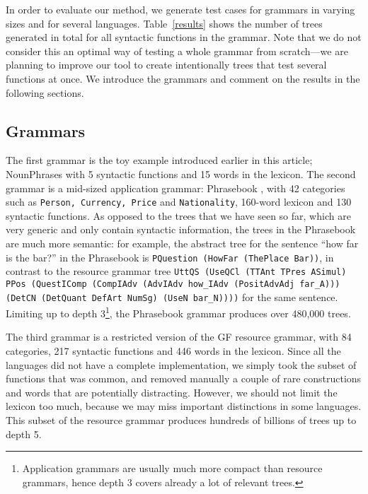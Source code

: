 \documentclass[11pt]{article}
\def\t#1{\texttt{#1}}
\begin{document}
In order to evaluate our method, we generate test cases for grammars
in varying sizes and for several languages. Table~\ref{results} shows
the number of trees generated in total for all syntactic functions in
the grammar. Note that we do not consider this an optimal way of
testing a whole grammar from scratch---we are planning to improve our
tool to create intentionally trees that test several functions at
once. 
We introduce the grammars and comment on the results in the following sections.

\subsection{Grammars}

The first grammar is the toy example introduced earlier in this
article; NounPhrases with 5 syntactic functions and 15 words in the
lexicon.
The second grammar is a mid-sized application grammar: Phrasebook
\cite{ranta2010phrasebook}, with 42 categories such as \t{Person,
  Currency, Price} and \t{Nationality}, 160-word lexicon and 130
syntactic functions. As opposed to the trees that we have seen so far,
which are very generic and only contain syntactic information, the
trees in the Phrasebook are much more semantic: for example, the
abstract tree for the sentence ``how far is the bar?'' in the
Phrasebook is \t{PQuestion (HowFar (ThePlace Bar))}, in contrast to the
resource grammar tree {\tt \small UttQS (UseQCl (TTAnt TPres ASimul)
  PPos (QuestIComp (CompIAdv (AdvIAdv how\_IAdv (PositAdvAdj far\_A)))
  (DetCN (DetQuant DefArt NumSg) (UseN bar\_N))))} for the same
sentence. Limiting up to depth 3\footnote{Application grammars are usually
much more compact than resource grammars, hence depth 3 covers already
a lot of relevant trees.}, the Phrasebook grammar produces over
480,000 trees.


The third grammar is a restricted version of the GF resource grammar,
with 84 categories, 217 syntactic functions and 446 words in the
lexicon. Since all the languages did not have a complete
implementation, we simply took the subset of functions that was
common, and removed manually a couple of rare constructions and words
that are potentially distracting. However, we should not limit the
lexicon too much, because we may miss important distinctions 
in some languages. This subset of the resource grammar produces
hundreds of billions of trees up to depth 5.
\end{document}
